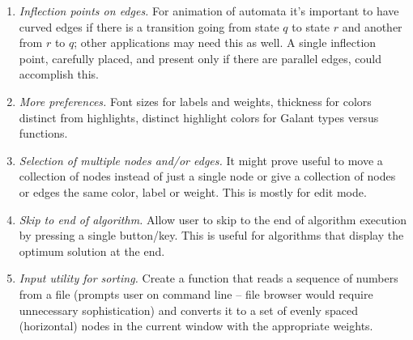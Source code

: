 \begin{enumerate}
\item \emph{Inflection points on edges.}  For animation of automata it's
  important to have curved edges if there is a transition going from state
  $q$ to state $r$ and another from $r$ to $q$; other applications may need
  this as well. A single inflection point, carefully placed, and present only
  if there are parallel edges, could accomplish this.

\item \emph{More preferences.} Font sizes for labels and weights, thickness for colors
  distinct from highlights, distinct highlight colors for Galant types versus functions.

\item \emph{Selection of multiple nodes and/or edges.}  It might prove useful
  to move a collection of nodes instead of just a single node or give a
  collection of nodes or edges the same color, label or weight. This is
  mostly for edit mode.

\item \emph{Skip to end of algorithm.} Allow user to skip to the end of
  algorithm execution by pressing a single button/key. This is
  useful for algorithms that display the optimum solution at the end.

\item \emph{Input utility for sorting.} Create a function that reads a
  sequence of numbers from a file (prompts user on command line -- file
  browser would require unnecessary sophistication) and converts it to a set
  of evenly spaced (horizontal) nodes in the current window with the
  appropriate weights.
  
\end{enumerate}

